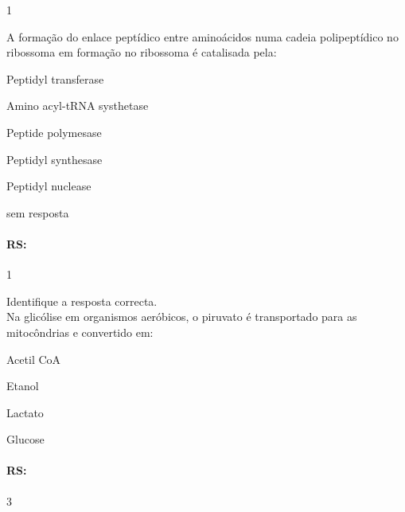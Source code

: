 \documentclass[\mainfilename]{subfiles}
\begin{document}
\begin{questionBox}1{}
    
    A formação do enlace peptídico entre aminoácidos numa cadeia polipeptídico no ribossoma em formação no ribossoma é catalisada pela:
    \begin{enumerate}[label={\alph*)}]
        \begin{multicols}{2}
            \item Peptidyl transferase
            \item Amino acyl-tRNA systhetase
            \item Peptide polymesase
            \item Peptidyl synthesase
            \item Peptidyl nuclease
            \item sem resposta
        \end{multicols}
    \end{enumerate}

    \paragraph{RS:}
    
\end{questionBox}

\begin{questionBox}1{}
    
    Identifique a resposta correcta.\\

    Na glicólise em organismos aeróbicos, o piruvato é transportado para as mitocôndrias  e convertido em:
    \begin{enumerate}
        \begin{multicols}{2}
            \item Acetil CoA 
            \item Etanol
            \item Lactato
            \item Glucose
        \end{multicols}
    \end{enumerate}

    \paragraph{RS:} 3
    
\end{questionBox}
\end{document}
